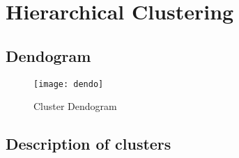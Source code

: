 

\section{Hierarchical Clustering}%
\label{sec:hierarchical_clustering}




\begin{landscape}

\subsection{Dendogram}%
\label{sub:dendogram}


\begin{figure}[H]
    \centering
    \texttt{[image: dendo]}
    \caption{Cluster Dendogram}%
    \label{fig:dendogram}
\end{figure}

\end{landscape}


\subsection{Description of clusters}%
\label{sub:description_of_clusters}



